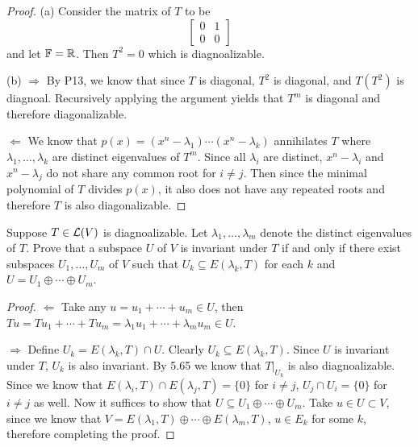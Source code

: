 \documentclass{extarticle}
\begin{document}
\begin{proof}
(a) Consider the matrix of \(T\) to be 
\[\begin{bmatrix}
    0 & 1 \\ 
    0 & 0
\end{bmatrix}\]
and let \(\mathbb{F} = \mathbb{R}\). Then \(T^2 = 0\) which is diagnoalizable.

(b) \(\Rightarrow\) By P13, we know that since \(T\) is diagonal, \(T^2\) is diagonal, and 
\(T(T^2)\) is diagnoal. Recursively applying the argument yields that \(T^m\) is diagonal and therefore 
diagonalizable. 

\(\Leftarrow\) We know that \(p(x) = (x^n - \lambda_1)\cdots(x^n - \lambda_k)\) annihilates \(T\) where 
\(\lambda_1, \ldots, \lambda_k\) are distinct eigenvalues of \(T^m\). Since all \(\lambda_i\) are distinct, 
\(x^n - \lambda_i\) and \(x^n - \lambda_j\) do not share any common root for \(i \neq j\). Then since the 
minimal polynomial of \(T\) divides \(p(x)\), it also does not have any repeated roots and therefore \(T\) 
is also diagonalizable. 
\end{proof}


\begin{problem}{16}
    Suppose \(T \in \mathcal{L}(V)\) is diagnoalizable. Let \(\lambda_1, \ldots, \lambda_m\) denote the distinct 
    eigenvalues of \(T\). Prove that a subspace \(U\) of \(V\) is invariant under \(T\) if and only if 
    there exist subspaces \(U_1, \ldots, U_m\) of \(V\) such that \(U_k \subseteq E(\lambda_k, T)\) for 
    each \(k\) and \(U = U_1 \oplus \cdots \oplus U_m\). 
\end{problem}

\begin{proof}
\(\Leftarrow\) Take any \(u = u_1 + \cdots + u_m \in U\), then \(Tu = Tu_1 + \cdots + Tu_m 
= \lambda_1 u_1 + \cdots + \lambda_m u_m \in U\). 

\(\Rightarrow\) Define \(U_k = E(\lambda_k, T) \cap U\). Clearly \(U_k \subseteq E(\lambda_k, T)\). 
Since \(U\) is invariant under \(T\), \({U_k}\) is also invariant. By 5.65 we know that 
\(T |_{U_k}\) is also diagnoalizable. Since we know that \(E(\lambda_i, T) \cap E(\lambda_j, T) = \{0\}\) for \(i \neq j\), 
\(U_j \cap U_i = \{0\}\) for \(i \neq j\) as well. Now it suffices to show that 
\(U \subseteq U_1 \oplus \cdots \oplus U_m\). Take \(u \in U \subset V\), since we know that 
\(V = E(\lambda_1, T) \oplus \cdots \oplus E(\lambda_m, T)\), \(u \in E_k\) for some \(k\), therefore 
completing the proof. 
\end{proof}
\end{document}
